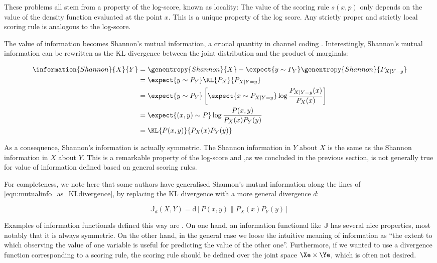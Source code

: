 These problems all stem from a property of the log-score, known as locality: The value of the scoring rule $s(x,p)$ only depends on the value of the density function evaluated at the point $x$. This is a unique property of the log score. Any strictly proper and strictly local scoring rule is analogous to the log-score.

The value of information becomes Shannon's mutual information, a crucial quantity in channel coding \cite{}. Interestingly, Shannon's mutual information can be rewritten as the KL divergence between the joint distribution and the product of marginals:

\begin{align}
	\information{Shannon}{X}{Y} &= \genentropy{Shannon}{X} - \expect{y \sim P_{Y}} \genentropy{Shannon}{P_{X\vert Y=y}}\\
		&= \expect{y \sim P_{Y}}\KL{P_X}{P_{X\vert Y=y}}\\
		&= \expect{y \sim P_{Y}}\left[\expect{x \sim P_{X\vert Y=y}} \log\frac{P_{X\vert Y=y}(x)}{P_X(x)} \right]\\
		&= \expect{(x,y) \sim P} \log \frac{P(x,y)}{P_{X}(x)P_{Y}(y)}\\
		&= \KL{P(x,y)}{P_{X}(x)P_{Y}(y)}\label{eqn:mutualinfo_as_KLdivergence}
\end{align}

As a consequence, Shannon's information is actually symmetric. The Shannon information in $Y$ about $X$ is the same as the Shannon information in $X$ about $Y$. This is a remarkable property of the log-score and ,as we concluded in the previous section, is not generally true for value of information defined based on general scoring rules.

For completeness, we note here that some authors have generalised Shannon's mutual information along the lines of \eqref{eqn:mutualinfo_as_KLdivergence}, by replacing the KL divergence with a more general divergence $d$:

\begin{equation}
	\mathbb{J}_{d}(X,Y) = \mbox{d}\left[ P(x,y) \middle\| P_{X}(x)P_{Y}(y) \right]\label{mutualinfo_generalisations}
\end{equation}

Examples of information functionals defined this way are \cite{}.
On one hand, an information functional like $\mathbb{J}$ has several nice properties, most notably that it is always symmetric. On the other hand, in the general case we loose the intuitive meaning of information as ``the extent to which observing the value of one variable is useful for predicting the value of the other one''. Furthermore, if we wanted to use a divergence function corresponding to a scoring rule, the scoring rule should be defined over the joint space $\Xe\times\Ye$, which is often not desired.

